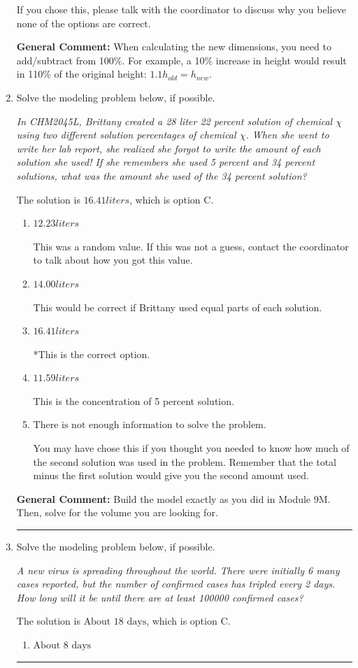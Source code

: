 \documentclass{extbook}[14pt]
\newcommand{\litem}[1]{\item #1

\rule{\textwidth}{0.4pt}}
\begin{document}
\begin{enumerate}
{\begin{enumerate}[label=\Alph*.]
If you chose this, please talk with the coordinator to discuss why you believe none of the options are correct.
\end{enumerate}

\textbf{General Comment:} When calculating the new dimensions, you need to add/subtract from 100\%. For example, a 10\% increase in height would result in 110\% of the original height: $1.1h_{old} = h_{new}$.
}
\litem{
Solve the modeling problem below, if possible.

\begin{center}
    \textit{ In CHM2045L, Brittany created a 28 liter 22 percent solution of chemical $\chi$ using two different solution percentages of chemical $\chi$. When she went to write her lab report, she realized she forgot to write the amount of each solution she used! If she remembers she used 5 percent and 34 percent solutions, what was the amount she used of the 34 percent solution? }
\end{center}
The solution is \( 16.41 liters \), which is option C.\begin{enumerate}[label=\Alph*.]
\item \( 12.23 liters \)

This was a random value. If this was not a guess, contact the coordinator to talk about how you got this value.
\item \( 14.00 liters \)

This would be correct if Brittany used equal parts of each solution.
\item \( 16.41 liters \)

*This is the correct option.
\item \( 11.59 liters \)

This is the concentration of 5 percent solution.
\item \( \text{There is not enough information to solve the problem.} \)

You may have chose this if you thought you needed to know how much of the second solution was used in the problem. Remember that the total minus the first solution would give you the second amount used.
\end{enumerate}

\textbf{General Comment:} Build the model exactly as you did in Module 9M. Then, solve for the volume you are looking for.
}
\litem{
Solve the modeling problem below, if possible.

\begin{center}
    \textit{ A new virus is spreading throughout the world. There were initially 6 many cases reported, but the number of confirmed cases has tripled every 2 days. How long will it be until there are at least 100000 confirmed cases? }
\end{center}
The solution is \( \text{About } 18 \text{ days} \), which is option C.\begin{enumerate}[label=\Alph*.]
\item \( \text{About } 8 \text{ days} \)


\end{enumerate}}
\end{enumerate}
\end{document}
